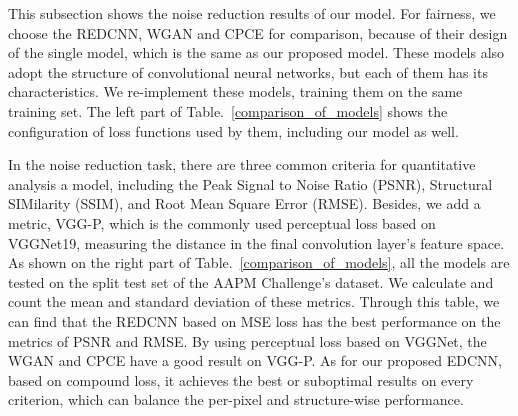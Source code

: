\documentclass[conference]{IEEEtran}
\begin{document}
            This subsection shows the noise reduction results of our model.
            For fairness, we choose the REDCNN\cite{Chen_2017}, WGAN\cite{Yang_2018} and CPCE\cite{Shan_2018} for comparison, because of their design of the single model, which is the same as our proposed model. 
            These models also adopt the structure of convolutional neural networks, but each of them has its characteristics. 
            We re-implement these models, training them on the same training set.
            The left part of Table.~\ref{comparison_of_models} shows the configuration of loss functions used by them, including our model as well.

            In the noise reduction task, there are three common criteria for quantitative analysis a model, including the Peak Signal to Noise Ratio (PSNR), Structural SIMilarity (SSIM), and Root Mean Square Error (RMSE).
            Besides, we add a metric, VGG-P, which is the commonly used perceptual loss based on VGGNet19\cite{simonyan2014deep}, measuring the distance in the final convolution layer's feature space\cite{10.1007/978-3-319-46475-6_43}. 
            As shown on the right part of Table.~\ref{comparison_of_models}, all the models are tested on the split test set of the AAPM Challenge's dataset.
            We calculate and count the mean and standard deviation of these metrics.
            Through this table, we can find that the REDCNN based on MSE loss has the best performance on the metrics of PSNR and RMSE.
            By using perceptual loss based on VGGNet, the WGAN and CPCE have a good result on VGG-P.
            As for our proposed EDCNN, based on compound loss, it achieves the best or suboptimal results on every criterion, which can balance the per-pixel and structure-wise performance.
\end{document}
